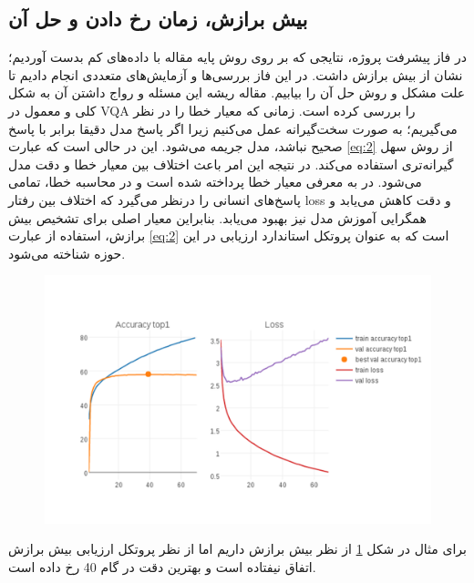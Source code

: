 {{	}

	\subsection{بیش برازش، زمان رخ دادن و حل آن}
	{
		در فاز پیشرفت پروژه، نتایجی که بر روی روش پایه مقاله با داده‌های کم بدست آوردیم؛ نشان از بیش برازش داشت. در این فاز بررسی‌ها و آزمایش‌های متعددی انجام دادیم تا علت مشکل و روش حل آن را بیابیم.
	مقاله
		\cite{ilievski2017simple}
		ریشه این مسئله و رواج داشتن آن به شکل کلی و معمول در VQA را بررسی کرده است.   زمانی که معیار خطا را 
		 در نظر می‌گیریم؛ به صورت سخت‌گیرانه عمل می‌کنیم زیرا اگر پاسخ مدل دقیقا برابر با پاسخ صحیح نباشد، مدل جریمه می‌شود. این در حالی است که عبارت
		\ref{eq:2}
		  از روش سهل گیرانه‌تری استفاده می‌کند. در نتیجه این امر باعث اختلاف بین معیار خطا
		و دقت  مدل می‌شود. در
	    \cite{ilievski2017simple}
		به معرفی معیار خطا
		  پرداخته شده است و در محاسبه خطا، تمامی پاسخ‌های انسانی را درنظر می‌گیرد که اختلاف بین رفتار loss و دقت کاهش می‌یابد و همگرایی آموزش مدل نیز بهبود می‌یابد. بنابراین معیار اصلی برای تشخیص بیش برازش، استفاده از عبارت
		  \ref{eq:2}
		 است که به عنوان پروتکل استاندارد ارزیابی در این حوزه شناخته می‌شود. 
		 \begin{figure}[H]
		 	\centering
		 	\includegraphics[scale=0.3]{images/i2.jpg}
		 	\caption{}
		 	\label{fig:9}
		 \end{figure}
		 برای مثال در شکل
		  \ref{fig:9}
		  از نظر
		   بیش برازش داریم اما از نظر پروتکل ارزیابی بیش برازش اتفاق نیفتاده است و بهترین دقت در گام 40 رخ داده است.
		   
}}
